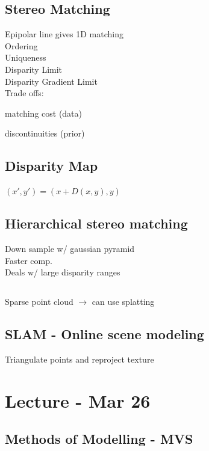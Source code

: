 \documentclass{article}
\begin{document}
\subsection{Stereo Matching}
Epipolar line gives 1D matching \\
Ordering
\\
Uniqueness
\\
Disparity Limit
\\
Disparity Gradient Limit
\\
Trade offs:
\begin{list}{}{}
  \item matching cost (data)
  \item discontinuities (prior)
\end{list}




\subsection{Disparity Map}
$(x',y') = (x+D(x,y),y)$

\subsection{Hierarchical stereo matching}
Down sample w/ gaussian pyramid
\\
Faster comp.
\\
Deals w/ large disparity ranges

\subsection{}
Sparse point cloud $\to$ can use splatting 

\subsection{SLAM - Online scene modeling}
Triangulate points and reproject texture

\section{Lecture - Mar 26}
\subsection{Methods of Modelling - MVS}
\end{document}
